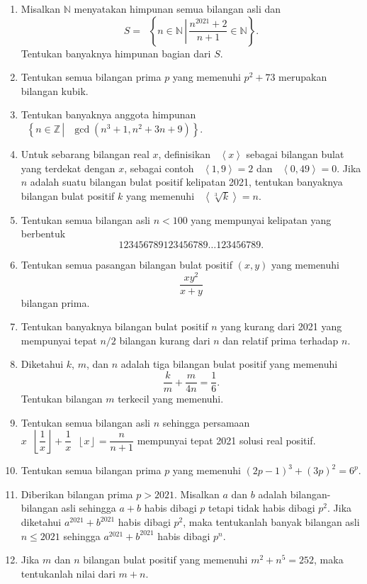 \documentclass[12pt]{article}
\newcommand*\floor[1]{\mathop{}\!\left\lfloor{#1}\right\rfloor}
\newcommand*\braket[1]{\mathop{}\!\left\langle{#1}\right\rangle}
\newcommand*\func[2]{\mathop{}\!{#1}{\left({#2}\right)}}
\newcommand*\set[2]{\mathop{}\!\left\lbrace{{#1} \, \left| \, {#2} \right.}\right\rbrace}
\begin{document}
\begin{enumerate}[leftmargin=*]
		\item Misalkan $ \mathbb{N} $ menyatakan himpunan semua bilangan asli dan
		\[ S = \set{n \in \mathbb{N}}{\frac{n^{2021} + 2}{n + 1} \in \mathbb{N}}. \]
		Tentukan banyaknya himpunan bagian dari $ S $.
		\item Tentukan semua bilangan prima $ p $ yang memenuhi $ p^{2} + 73 $ merupakan bilangan kubik.
		\item Tentukan banyaknya anggota himpunan $ \set{n \in \mathbb{Z}}{\func{\gcd}{n^{3} + 1, n^{2} + 3n + 9}} $.
		\item Untuk sebarang bilangan real $ x $, definisikan $ \braket{x} $ sebagai bilangan bulat yang terdekat dengan $ x $, sebagai contoh $ \braket{1,9} = 2 $ dan $ \braket{0,49} = 0 $. Jika $ n $ adalah suatu bilangan bulat positif kelipatan 2021, tentukan banyaknya bilangan bulat positif $ k $ yang memenuhi $ \braket{\sqrt[3]{k}} = n $.
		\item Tentukan semua bilangan asli $ n < 100 $ yang mempunyai kelipatan yang berbentuk
		\[ 123456789123456789 \dots 123456789. \]
		\item Tentukan semua pasangan bilangan bulat positif $ \left(x, y\right) $ yang memenuhi
		\[ \frac{xy^{2}}{x + y} \]
		bilangan prima.
		\item Tentukan banyaknya bilangan bulat positif $ n $ yang kurang dari 2021 yang mempunyai tepat $ n/2 $ bilangan kurang dari $ n $ dan relatif prima terhadap $ n $.
		\item Diketahui $ k $, $ m $, dan $ n $ adalah tiga bilangan bulat positif yang memenuhi
		\[ \frac{k}{m} + \frac{m}{4n} = \frac{1}{6}. \]
		Tentukan bilangan $ m $ terkecil yang memenuhi.
		\item Tentukan semua bilangan asli $ n $ sehingga persamaan $ x\floor{\dfrac{1}{x}} + \dfrac{1}{x}\floor{x} = \dfrac{n}{n + 1} $ mempunyai tepat 2021 solusi real positif.
		\item Tentukan semua bilangan prima $ p $ yang memenuhi $ \left(2p - 1\right)^{3} + \left(3p\right)^{2} = 6^{p} $.
		\item Diberikan bilangan prima $ p > 2021 $. Misalkan $ a $ dan $ b $ adalah bilangan-bilangan asli sehingga $ a + b $ habis dibagi $ p $ tetapi tidak habis dibagi $ p^{2} $. Jika diketahui $ a^{2021} + b^{2021} $ habis dibagi $ p^{2} $, maka tentukanlah banyak bilangan asli $ n \leq 2021 $ sehingga $ a^{2021} + b^{2021} $ habis dibagi $ p^{n} $.
		\item Jika $ m $ dan $ n $ bilangan bulat positif yang memenuhi $ m^{2} + n^{5} = 252 $, maka tentukanlah nilai dari $ m + n $.

\end{enumerate}
\end{document}
